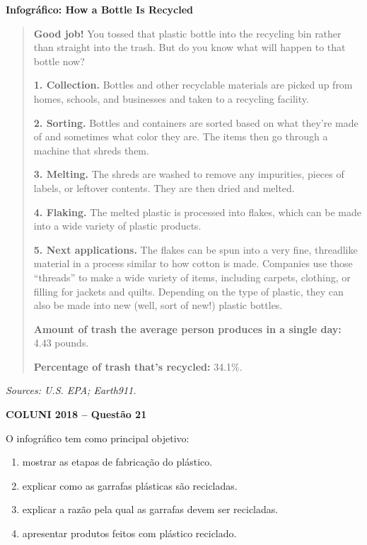 \textbf{Infográfico: How a Bottle Is Recycled}

\begin{quote}
\textbf{Good job!} You tossed that plastic bottle into the recycling bin rather than straight into the trash. But do you know what will happen to that bottle now?

\textbf{1. Collection.} Bottles and other recyclable materials are picked up from homes, schools, and businesses and taken to a recycling facility.

\textbf{2. Sorting.} Bottles and containers are sorted based on what they're made of and sometimes what color they are. The items then go through a machine that shreds them.

\textbf{3. Melting.} The shreds are washed to remove any impurities, pieces of labels, or leftover contents. They are then dried and melted.

\textbf{4. Flaking.} The melted plastic is processed into flakes, which can be made into a wide variety of plastic products.

\textbf{5. Next applications.} The flakes can be spun into a very fine, threadlike material in a process similar to how cotton is made. Companies use those ``threads'' to make a wide variety of items, including carpets, clothing, or filling for jackets and quilts. Depending on the type of plastic, they can also be made into new (well, sort of new!) plastic bottles.

\textbf{Amount of trash the average person produces in a single day:} 4.43 pounds.

\textbf{Percentage of trash that's recycled:} 34.1\%.
\end{quote}

\textit{Sources: U.S. EPA; Earth911.}

\textbf{COLUNI 2018 -- Questão 21}\par\medskip O infográfico tem como principal objetivo:\begin{enumerate}
\item mostrar as etapas de fabricação do plástico.
\item explicar como as garrafas plásticas são recicladas.
\item explicar a razão pela qual as garrafas devem ser recicladas.
\item apresentar produtos feitos com plástico reciclado.\end{enumerate}
